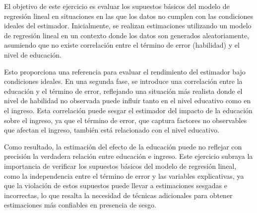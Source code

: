 \documentclass[
]{article}
\begin{document}
El objetivo de este ejercicio es evaluar los supuestos básicos del
modelo de regresión lineal en situaciones en las que los datos no
cumplen con las condiciones ideales del estimador. Inicialmente, se
realizan estimaciones utilizando un modelo de regresión lineal en un
contexto donde los datos son generados aleatoriamente, asumiendo que no
existe correlación entre el término de error (habilidad) y el nivel de
educación.

Esto proporciona una referencia para evaluar el rendimiento del
estimador bajo condiciones ideales. En una segunda fase, se introduce
una correlación entre la educación y el término de error, reflejando una
situación más realista donde el nivel de habilidad no observada puede
influir tanto en el nivel educativo como en el ingreso. Esta correlación
puede sesgar el estimador del impacto de la educación sobre el ingreso,
ya que el término de error, que captura factores no observables que
afectan el ingreso, también está relacionado con el nivel educativo.

Como resultado, la estimación del efecto de la educación puede no
reflejar con precisión la verdadera relación entre educación e ingreso.
Este ejercicio subraya la importancia de verificar los supuestos básicos
del modelo de regresión lineal, como la independencia entre el término
de error y las variables explicativas, ya que la violación de estos
supuestos puede llevar a estimaciones sesgadas e incorrectas, lo que
resalta la necesidad de técnicas adicionales para obtener estimaciones
más confiables en presencia de sesgo.
\end{document}
